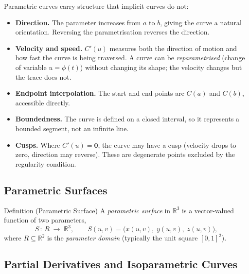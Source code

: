 \begin{remark*}
Parametric curves carry structure that implicit curves do not:
\begin{itemize}
  \item \textbf{Direction.}
        The parameter increases from $a$ to $b$, giving the curve
        a natural orientation.
        Reversing the parametrisation reverses the direction.
  \item \textbf{Velocity and speed.}
        $C'(u)$ measures both the direction of motion and how fast
        the curve is being traversed.
        A curve can be \emph{reparametrised} (change of variable
        $u = \phi(t)$) without changing its shape;
        the velocity changes but the trace does not.
  \item \textbf{Endpoint interpolation.}
        The start and end points are $C(a)$ and $C(b)$, accessible directly.
  \item \textbf{Boundedness.}
        The curve is defined on a closed interval, so it represents
        a bounded segment, not an infinite line.
  \item \textbf{Cusps.}
        Where $C'(u) = \mathbf{0}$, the curve may have a cusp
        (velocity drops to zero, direction may reverse).
        These are degenerate points excluded by the regularity condition.
\end{itemize}
\end{remark*}

\subsection*{Parametric Surfaces}

\begin{propositionbox}{Definition (Parametric Surface)}
A \emph{parametric surface} in $\mathbb{R}^3$ is a vector-valued function
of two parameters,
\[
  S\,:\,R\;\longrightarrow\;\mathbb{R}^3, \qquad
  S(u,v) = \bigl(x(u,v),\;y(u,v),\;z(u,v)\bigr),
\]
where $R\subseteq\mathbb{R}^2$ is the \emph{parameter domain}
(typically the unit square $[0,1]^2$).
\end{propositionbox}

\subsection*{Partial Derivatives and Isoparametric Curves}

